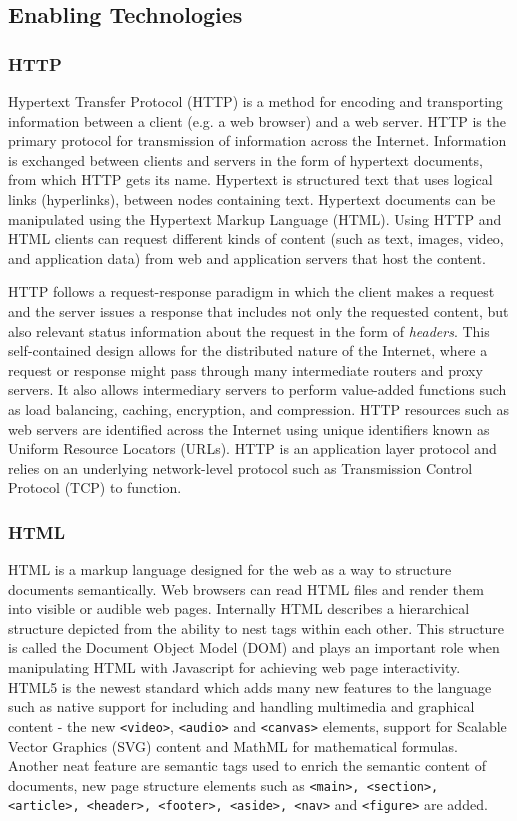 \subsection{Enabling Technologies}
\subsubsection{HTTP}
Hypertext Transfer Protocol (HTTP) is a method for encoding and transporting information between a client (e.g. a web browser) and a web server. HTTP is the primary protocol for transmission of information across the Internet. Information is exchanged between clients and servers in the form of hypertext documents, from which HTTP gets its name. Hypertext is structured text that uses logical links (hyperlinks), between nodes containing text. Hypertext documents can be manipulated using the Hypertext Markup Language (HTML). Using HTTP and HTML clients can request different kinds of content (such as text, images, video, and application data) from web and application servers that host the content.

HTTP follows a request-response paradigm in which the client makes a request and the server issues a response that includes not only the requested content, but also relevant status information about the request in the form of \textit{headers}. This self-contained design allows for the distributed nature of the Internet, where a request or response might pass through many intermediate routers and proxy servers. It also allows intermediary servers to perform value-added functions such as load balancing, caching, encryption, and compression. HTTP resources such as web servers are identified across the Internet using unique identifiers known as Uniform Resource Locators (URLs). HTTP is an application layer protocol and relies on an underlying network-level protocol such as Transmission Control Protocol (TCP) to function.

\subsubsection{HTML}
HTML is a markup language designed for the web as a way to structure documents semantically. Web browsers can read HTML files and render them into visible or audible web pages. Internally HTML describes a hierarchical structure depicted from the ability to nest tags within each other. This structure is called the Document Object Model (DOM) and plays an important role when manipulating HTML with Javascript for achieving web page interactivity. HTML5 is the newest standard which adds many new features to the language such as native support for including and handling multimedia and graphical content - the new \verb|<video>|, \verb|<audio>| and \verb|<canvas>| elements, support for Scalable Vector Graphics (SVG) content and MathML for mathematical formulas. Another neat feature are semantic tags used to enrich the semantic content of documents, new page structure elements such as \verb|<main>, <section>, <article>, <header>, <footer>, <aside>, <nav>| and \verb|<figure>| are added.  

